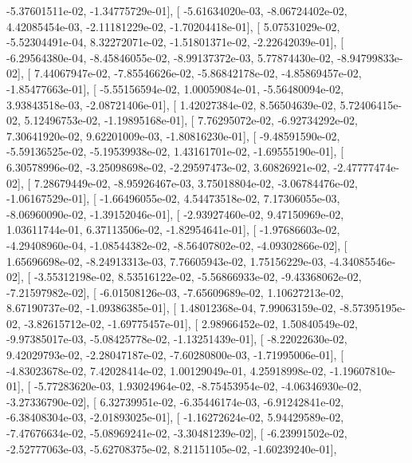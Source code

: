\documentclass{article}
\begin{document}
         -5.37601511e-02,  -1.34775729e-01],
       [ -5.61634020e-03,  -8.06724402e-02,   4.42085454e-03,
         -2.11181229e-02,  -1.70204418e-01],
       [  5.07531029e-02,  -5.52304491e-04,   8.32272071e-02,
         -1.51801371e-02,  -2.22642039e-01],
       [ -6.29564380e-04,  -8.45846055e-02,  -8.99137372e-03,
          5.77874430e-02,  -8.94799833e-02],
       [  7.44067947e-02,  -7.85546626e-02,  -5.86842178e-02,
         -4.85869457e-02,  -1.85477663e-01],
       [ -5.55156594e-02,   1.00059084e-01,  -5.56480094e-02,
          3.93843518e-03,  -2.08721406e-01],
       [  1.42027384e-02,   8.56504639e-02,   5.72406415e-02,
          5.12496753e-02,  -1.19895168e-01],
       [  7.76295072e-02,  -6.92734292e-02,   7.30641920e-02,
          9.62201009e-03,  -1.80816230e-01],
       [ -9.48591590e-02,  -5.59136525e-02,  -5.19539938e-02,
          1.43161701e-02,  -1.69555190e-01],
       [  6.30578996e-02,  -3.25098698e-02,  -2.29597473e-02,
          3.60826921e-02,  -2.47777474e-02],
       [  7.28679449e-02,  -8.95926467e-03,   3.75018804e-02,
         -3.06784476e-02,  -1.06167529e-01],
       [ -1.66496055e-02,   4.54473518e-02,   7.17306055e-03,
         -8.06960090e-02,  -1.39152046e-01],
       [ -2.93927460e-02,   9.47150969e-02,   1.03611744e-01,
          6.37113506e-02,  -1.82954641e-01],
       [ -1.97686603e-02,  -4.29408960e-04,  -1.08544382e-02,
         -8.56407802e-02,  -4.09302866e-02],
       [  1.65696698e-02,  -8.24913313e-03,   7.76605943e-02,
          1.75156229e-03,  -4.34085546e-02],
       [ -3.55312198e-02,   8.53516122e-02,  -5.56866933e-02,
         -9.43368062e-02,  -7.21597982e-02],
       [ -6.01508126e-03,  -7.65609689e-02,   1.10627213e-02,
          8.67190737e-02,  -1.09386385e-01],
       [  1.48012368e-04,   7.99063159e-02,  -8.57395195e-02,
         -3.82615712e-02,  -1.69775457e-01],
       [  2.98966452e-02,   1.50840549e-02,  -9.97385017e-03,
         -5.08425778e-02,  -1.13251439e-01],
       [ -8.22022630e-02,   9.42029793e-02,  -2.28047187e-02,
         -7.60280800e-03,  -1.71995006e-01],
       [ -4.83023678e-02,   7.42028414e-02,   1.00129049e-01,
          4.25918998e-02,  -1.19607810e-01],
       [ -5.77283620e-03,   1.93024964e-02,  -8.75453954e-02,
         -4.06346930e-02,  -3.27336790e-02],
       [  6.32739951e-02,  -6.35446174e-03,  -6.91242841e-02,
         -6.38408304e-03,  -2.01893025e-01],
       [ -1.16272624e-02,   5.94429589e-02,  -7.47676634e-02,
         -5.08969241e-02,  -3.30481239e-02],
       [ -6.23991502e-02,  -2.52777063e-03,  -5.62708375e-02,
          8.21151105e-02,  -1.60239240e-01],
\end{document}
